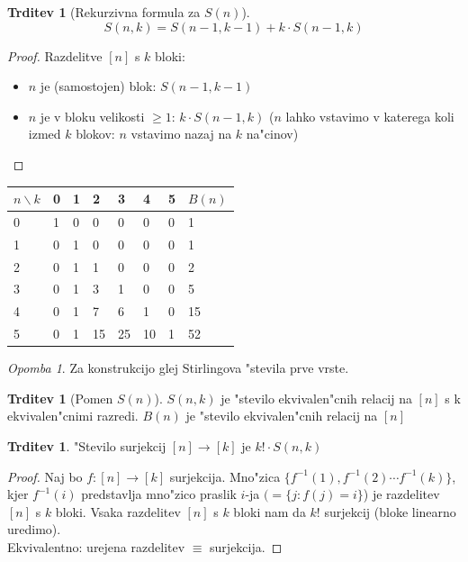 \documentclass[a4paper,12pt]{article}
\theoremstyle{definition}
\newtheorem{claim}[counter]{Trditev}
\theoremstyle{remark}
\newtheorem*{rem}{Opomba}
\begin{document}
\begin{claim}[Rekurzivna formula za $S(n)$]
    \[S(n, k) = S(n-1, k-1) + k \cdot S(n-1, k)\]
\end{claim}

\begin{proof}
    Razdelitve $[n]$ s $k$ bloki:
    \begin{itemize}
        \item $n$ je (samostojen) blok: $S(n-1, k-1)$
        \item $n$ je v bloku velikosti $\geq 1$: $k \cdot S(n-1, k)$ ($n$ lahko vstavimo v katerega koli izmed $k$ blokov: $n$ vstavimo nazaj na $k$ na"cinov)
    \end{itemize}
\end{proof}

\begin{center}
	\begin{tabular}{l|llllll|l}
	    $n \backslash k$ & 0 & 1  & 2  & 3  & 4  & 5 & $B(n)$ \\
	    \hline
	    0 & 1 & 0  & 0  & 0  & 0  & 0 & 1 \\
	    1 & 0 & 1  & 0  & 0  & 0  & 0 & 1 \\
	    2 & 0 & 1  & 1  & 0  & 0  & 0 & 2 \\
	    3 & 0 & 1  & 3  & 1  & 0  & 0 & 5 \\
	    4 & 0 & 1  & 7  & 6  & 1  & 0 & 15 \\
	    5 & 0 & 1  & 15 & 25 & 10 & 1 & 52
	\end{tabular}
\end{center}

\begin{rem}
	Za konstrukcijo glej Stirlingova "stevila prve vrste.
\end{rem}

\begin{claim}[Pomen $S(n)$]
    $S(n,k)$ je "stevilo ekvivalen"cnih relacij na $[n]$ s k ekvivalen"cnimi razredi. $B(n)$ je "stevilo ekvivalen"cnih relacij na $[n]$
\end{claim}

\begin{claim}
    "Stevilo surjekcij $[n] \rightarrow [k]$ je $k! \cdot S(n,k)$
\end{claim}

\begin{proof}
    Naj bo $f: [n] \rightarrow [k]$ surjekcija.
    Mno"zica $\{f^{-1}(1), f^{-1}(2) \cdots f^{-1}(k)\}$, kjer $f^{-1}(i)$ predstavlja mno"zico praslik $i$-ja $(=\{j: f(j) = i\}$) je razdelitev $[n]$ s $k$ bloki. Vsaka razdelitev $[n]$ s $k$ bloki nam da $k!$ surjekcij
    (bloke linearno uredimo).
    \\
    Ekvivalentno: urejena razdelitev $\equiv$ surjekcija.
\end{proof}
\end{document}
